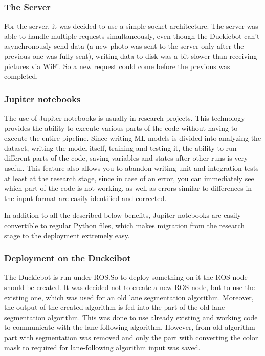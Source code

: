 \subsubsection{The Server}
For the server, it was decided to use a simple socket architecture. 
The server was able to handle multiple requests simultaneously, even though the Duckiebot can't asynchronously send data 
(a new photo was sent to the server only after the previous one was fully sent), writing data to disk was a bit slower than receiving pictures via WiFi. 
So a new request could come before the previous was completed. 
\subsubsection{Jupiter notebooks}
The use of Jupiter notebooks is usually in research projects. 
This technology provides the ability to execute various parts of the code without having to execute the entire pipeline. 
Since writing ML models is divided into analyzing the dataset, writing the model itself, training and testing it, 
the ability to run different parts of the code, saving variables and states after other runs is very useful.
This feature also allows you to abandon writing unit and integration tests at least at the research stage, since in case of an error, 
you can immediately see which part of the code is not working, as well as errors similar to differences in the input format are easily identified and corrected.

In addition to all the described below benefits, Jupiter notebooks are easily convertible to regular Python files, which makes migration from the research stage
to the deployment extremely easy.

\subsubsection{Deployment on the Duckeibot}
The Duckiebot is run under ROS.\@ So to deploy something on it the ROS node should be created. It was decided not to create a new ROS node, but to use the existing one,
which was used for an old lane segmentation algorithm. Moreover, the output of the created algorithm is fed into the part of the old lane segmentation algorithm.
This was done to use already existing and working code to communicate with the lane-following algorithm. However, from old algorithm part with segmentation was 
removed and only the part with converting the color mask to required for lane-following algorithm input was saved.